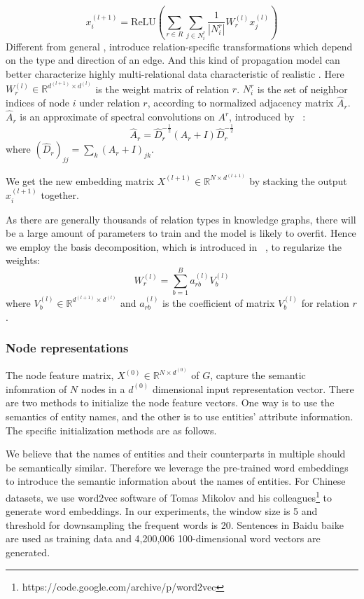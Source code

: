 	\begin{equation}
	x_i^{(l+1)}=\mathrm{ReLU} (\sum\limits_{r \in R}\sum\limits_{j \in N_i^r}\frac{1}{|N_i^r|}W_r^{(l)}x_j^{(l)})
	\end{equation}
	Different from general \GCNs, \RGCNs introduce relation-specific transformations which depend on the type and direction of an edge. And this kind of propagation model can better characterize highly multi-relational data characteristic of realistic \KGs. Here $W_r^{(l)} \in \mathbb{R}^{d^{(l+1)} \times d^{(l)}}$ is the weight matrix of relation $r$. $N_i^r$ is the set of neighbor indices of node $i$ under relation $r$, according to normalized adjacency matrix $\hat A_r$. $\hat A_r$ is an approximate of spectral convolutions on $A^r$, introduced by ~\cite{Kipf2016Semi}:
	\begin{equation}
	\hat A_r=\hat D_r^{- \frac{1}{2}}(A_r+I)\hat D_r^{- \frac{1}{2}}
	\end{equation}
	where $(\hat D_r)_{jj}=\sum_k(A_r+I)_{jk}$.
	
	We get the new embedding matrix $X^{(l+1)} \in \mathbb{R}^{N \times d^{(l+1)}}$ by stacking the output $x_i^{(l+1)}$ together.
	
	As there are generally thousands of relation types in knowledge graphs, there will be a large amount of parameters to train and the model is likely to overfit. Hence we employ the basis decomposition, which is introduced in ~\cite{Schlichtkrull2017Modeling}, to regularize the weights:
	\begin{equation}
	W_r^{(l)}=\sum\limits_{b=1}^B a_{rb}^{(l)}V_b^{(l)}
	\end{equation}
	where $V_b^{(l)} \in \mathbb{R}^{d^{(l+1)} \times d^{(l)}}$ and $a_{rb}^{(l)}$ is the coefficient of matrix $V_b^{(l)}$ for relation $r$.
	

	\subsubsection{Node representations}
	\label{subsection:Node Representations}
   The node feature matrix, $X^{(0)} \in \mathbb{R}^{N \times d^{(0)}}$ of $G$, capture the semantic infomration of $N$  nodes in a $d^{(0)}$ dimensional input representation vector.
	There are two methods to initialize the node feature vectors.
	One way is to use the semantics of entity names, and the other is to use entities' attribute information. The specific initialization methods are as follows.
	
	\label{wordvector}
	We believe that the names of entities and their counterparts in multiple \KGs should be semantically similar. Therefore we leverage the pre-trained word embeddings to introduce the semantic information about the names of entities.
	For Chinese datasets, we use word2vec software of Tomas Mikolov and his colleagues\footnote{https://code.google.com/archive/p/word2vec} to generate word embeddings. In our experiments, the window size is 5 and threshold for downsampling the frequent words is 20. Sentences in Baidu baike are used as training data and 4,200,006 100-dimensional word vectors are generated.
	
